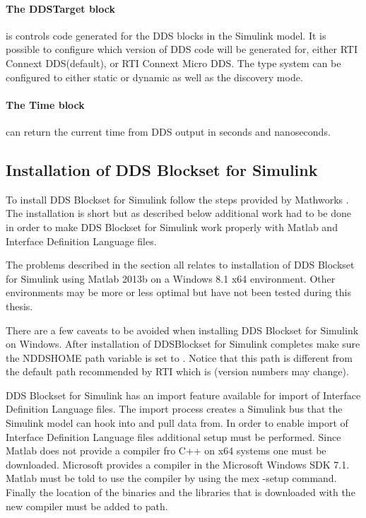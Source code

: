 \paragraph{The DDSTarget block} is controls code generated for the DDS blocks in the Simulink model. It is possible to configure which version of DDS code will be generated for, either RTI Connext DDS(default), or RTI Connext Micro DDS. The type system can be configured to either static or dynamic as well as the discovery mode.

\paragraph{The Time block} can return the current time from DDS output in seconds and nanoseconds.

\subsection{Installation of DDS Blockset for Simulink}
To install DDS Blockset for Simulink follow the steps provided by Mathworks \cite{DDSBlocksetPilotSupportPackageUserGuide}. The installation is short but as described below additional work had to be done in order to make DDS Blockset for Simulink work properly with Matlab and Interface Definition Language files.

The problems described in the section all relates to installation of DDS Blockset for Simulink using Matlab 2013b on a Windows 8.1 x64 environment.
Other environments may be more or less optimal but have not been tested during this thesis.

There are a few caveats to be avoided when installing DDS Blockset for Simulink on Windows.
After installation of DDSBlockset for Simulink completes make sure the NDDSHOME path variable is set to .
Notice that this path is different from the default path recommended by RTI which is  (version numbers may change).

DDS Blockset for Simulink has an import feature available for import of Interface Definition Language files. The import process creates a Simulink bus that the Simulink model can hook into and pull data from. In order to enable import of Interface Definition Language files additional setup must be performed.
Since Matlab does not provide a compiler fro C++ on x64 systems one must be downloaded. Microsoft provides a compiler in the Microsoft Windows SDK 7.1. Matlab must be told to use the compiler by using the mex -setup command. Finally the location of the binaries and the libraries that is downloaded with the new compiler must be added to path.

